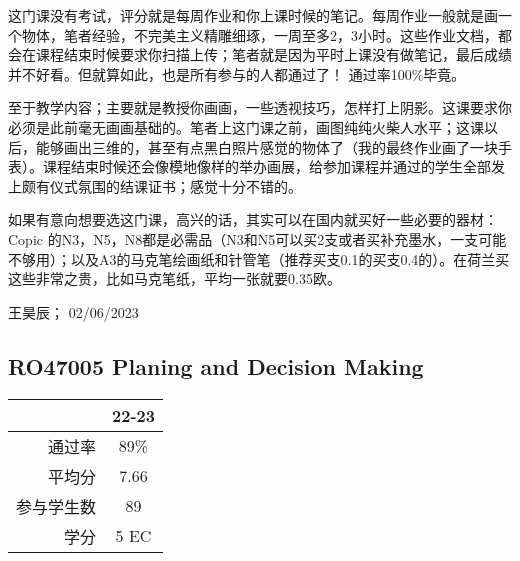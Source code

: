 这门课没有考试，评分就是每周作业和你上课时候的笔记。每周作业一般就是画一个物体，笔者经验，不完美主义精雕细琢，一周至多2，3小时。这些作业文档，都会在课程结束时候要求你扫描上传；笔者就是因为平时上课没有做笔记，最后成绩并不好看。但就算如此，也是所有参与的人都通过了！ 通过率100\%毕竟。

至于教学内容；主要就是教授你画画，一些透视技巧，怎样打上阴影。这课要求你必须是此前毫无画画基础的。笔者上这门课之前，画图纯纯火柴人水平；这课以后，能够画出三维的，甚至有点黑白照片感觉的物体了（我的最终作业画了一块手表）。课程结束时候还会像模地像样的举办画展，给参加课程并通过的学生全部发上颇有仪式氛围的结课证书；感觉十分不错的。

如果有意向想要选这门课，高兴的话，其实可以在国内就买好一些必要的器材：Copic 的N3，N5，N8都是必需品（N3和N5可以买2支或者买补充墨水，一支可能不够用）；以及A3的马克笔绘画纸和针管笔（推荐买支0.1的买支0.4的）。在荷兰买这些非常之贵，比如马克笔纸，平均一张就要0.35欧。
\begin{flushright}
王昊辰； 02/06/2023
\end{flushright}

\subsection{RO47005 Planing and Decision Making}
\begin{minipage}{0.45\textwidth}
\centering
{}
\end{minipage}%
\begin{minipage}{0.45\textwidth}
\raggedleft
\begin{tabular}{r|c}
\textbf{ } & \textbf{22-23} \\ \hline
通过率 & 89\% \\ 
平均分 & 7.66 \\ 
参与学生数 & 89 \\ 
学分 & 5 EC\\
\end{tabular}
\end{minipage}\\

